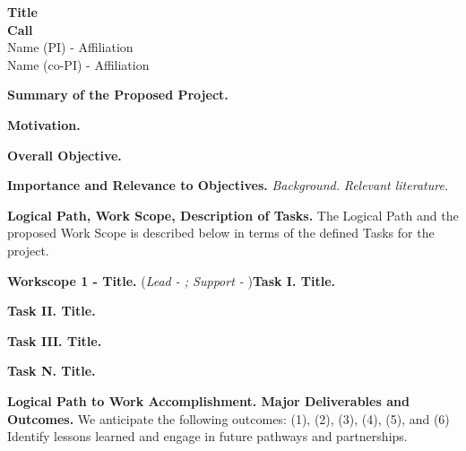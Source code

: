\documentclass[11pt,letterpaper]{article}
\begin{document}
{\centering 
    \textbf{Title\\
    Call\\
    }
    Name (PI) - Affiliation\\
    Name (co-PI) - Affiliation 
\par
}

\vspace{0.5\baselineskip}

\noindent\textbf{Summary of the Proposed Project.} 

\vspace{0.5\baselineskip}

\noindent\textbf{Motivation.}

\vspace{0.5\baselineskip}

\noindent\textbf{Overall Objective.}

\vspace{0.5\baselineskip}

\noindent\textbf{Importance and Relevance to Objectives.} \textit{Background.} \textit{Relevant literature.}


\vspace{0.5\baselineskip}

\noindent\textbf{Logical Path, Work Scope, Description of Tasks.} The Logical Path and the proposed Work Scope is described below in terms of the defined Tasks for the project.

\vspace{0.25\baselineskip}

\noindent\textbf{Workscope 1 - Title.} (\textit{Lead - ; Support - })\textbf{Task I. Title.}

\vspace{0.25\baselineskip}

\noindent\textbf{Task II. Title.}

\vspace{0.25\baselineskip}

\noindent\textbf{Task III. Title.}

\vspace{0.25\baselineskip}

\noindent\textbf{Task N. Title.}

\vspace{0.5\baselineskip}

\noindent\textbf{Logical Path to Work Accomplishment. Major Deliverables and Outcomes.} We anticipate the following outcomes: (1), (2), (3), (4), (5), and (6) Identify lessons learned and engage in future pathways and partnerships.
\end{document}
